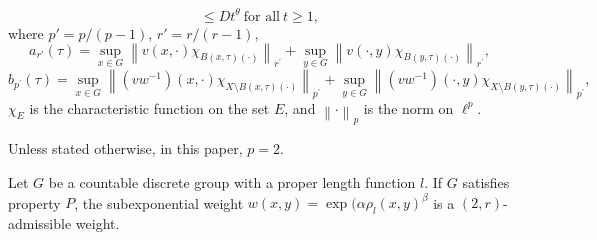 \documentclass[10pt,a4paper]{amsart}
\begin{document}
\begin{definition}
\begin{equation}
			\le Dt^\theta ~ \text{for~all}~ t\ge 1,
		\end{equation} 
		where ${p}' =p/\left(p-1 \right)$, $r' =r/\left ( r-1 \right )$,
		\begin{equation*}\label{w3}
			a_{r'}(\tau)=\sup_{x\in G}\left \| v\left ( x,\cdot \right )\chi _{B\left ( x,\tau  \right )\left ( \cdot  \right )  }  \right \|_{r^{'}} +\sup_{y\in G}\left \| v\left ( \cdot,y \right )\chi _{B\left (y, \tau  \right )\left ( \cdot  \right )  } \right \|_{r^{'}},
		\end{equation*}
		\begin{equation*}
			b_{p^{'}}(\tau)=\sup_{x\in G}\left \| (vw^{-1})\left ( x,\cdot \right )\chi _{X\setminus B\left ( x,\tau  \right )\left ( \cdot  \right )  }  \right \|_{p^{'}} +\sup_{y\in G}\left \|( vw^{-1})\left ( \cdot,y \right )\chi _{X\setminus B\left (y, \tau  \right )\left ( \cdot  \right )  } \right \|_{p^{'}},
		\end{equation*}
		$\chi _{E}$ is the characteristic function on the set $E$, and $\left \| \cdot  \right \| _{p}$ is the norm on $\ell^{p}$.
		
		Unless stated otherwise, in this paper, $p=2$.
	\end{definition}

	\begin{theorem}\label{thm4.2}
		Let $G$ be a countable discrete group with a proper length function $l$. If $G$ satisfies property $P$,  the subexponential weight $w(x,y)=\exp(\alpha \rho_{l }(x,y)^{\beta}$ is a $(2,r)$-admissible weight.
	\end{theorem}
\end{document}
